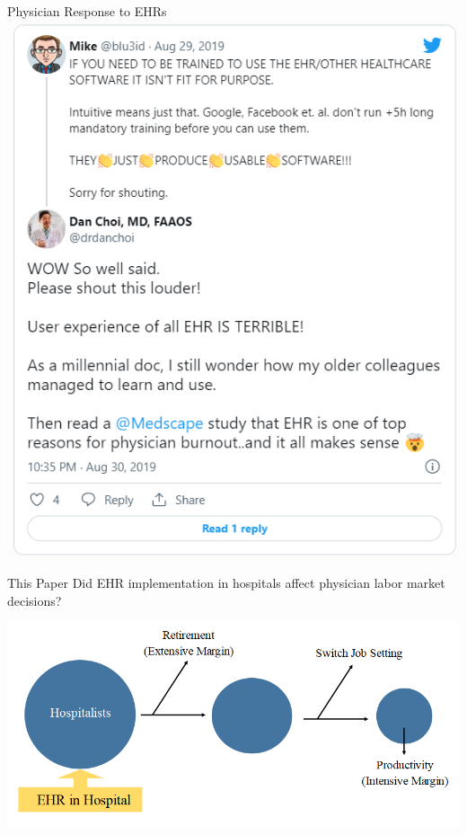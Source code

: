 \documentclass[10pt]{beamer}
\begin{document}
\begin{frame}{Physician Response to EHRs}
\centering
\includegraphics[scale=.4]{graphics/EHR tweet.PNG}
\end{frame}



\begin{frame}{This Paper}
Did EHR implementation in hospitals affect physician labor market decisions?
                \vspace{4mm}
\begin{center}
\includegraphics[scale=.4]{Objects/EHR_FlowChart_General.PNG}
\end{center}
\end{frame}
\end{document}
